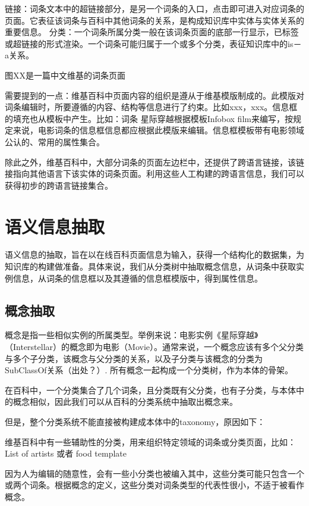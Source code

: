 {\heiti 链接：}词条文本中的超链接部分，是另一个词条的入口，点击即可进入对应词条的页面。它表征该词条与百科中其他词条的关系，是构成知识库中实体与实体关系的重要信息。
分类：一个词条所属分类一般在该词条页面的底部一行显示，已标签或超链接的形式渲染。一个词条可能归属于一个或多个分类，表征知识库中的is－a关系。

图XX是一篇中文维基的词条页面

需要提到的一点：维基百科中页面内容的组织是遵从于维基模版制成的。此模版对词条编辑时，所要遵循的内容、结构等信息进行了约束。比如xxx，xxx。信息框的填充也从模板中产生。比如：词条 星际穿越根据模板Infobox film来编写，按规定来说，电影词条的信息框信息都应根据此模版来编辑。信息框模板带有电影领域公认的、常用的属性集合。

除此之外，维基百科中，大部分词条的页面左边栏中，还提供了跨语言链接，该链接指向其他语言下该实体的词条页面。利用这些人工构建的跨语言信息，我们可以获得初步的跨语言链接集合。


\section{语义信息抽取}
\label{sec3:extract}

语义信息的抽取，旨在以在线百科页面信息为输入，获得一个结构化的数据集，为知识库的构建做准备。具体来说，我们从分类树中抽取概念信息，从词条中获取实例信息，从词条的信息框以及其遵循的信息框模版中，得到属性信息。

\subsection{概念抽取}

概念是指一些相似实例的所属类型。举例来说：电影实例《星际穿越》（Interstellar）的概念即为电影（Movie）。通常来说，一个概念应该有多个父分类与多个子分类，该概念与父分类的关系，以及子分类与该概念的分类为SubClassOf关系（出处？）. 所有概念一起构成一个分类树，作为本体的骨架。

在百科中，一个分类集合了几个词条，且分类既有父分类，也有子分类，与本体中的概念相似，因此我们可以从百科的分类系统中抽取出概念来。

但是，整个分类系统不能直接被构建成本体中的taxonomy，原因如下：

维基百科中有一些辅助性的分类，用来组织特定领域的词条或分类页面，比如： List of artists 或者 food template

因为人为编辑的随意性，会有一些小分类也被编入其中，这些分类可能只包含一个或两个词条。根据概念的定义，这些分类对词条类型的代表性很小，不适于被看作概念。

